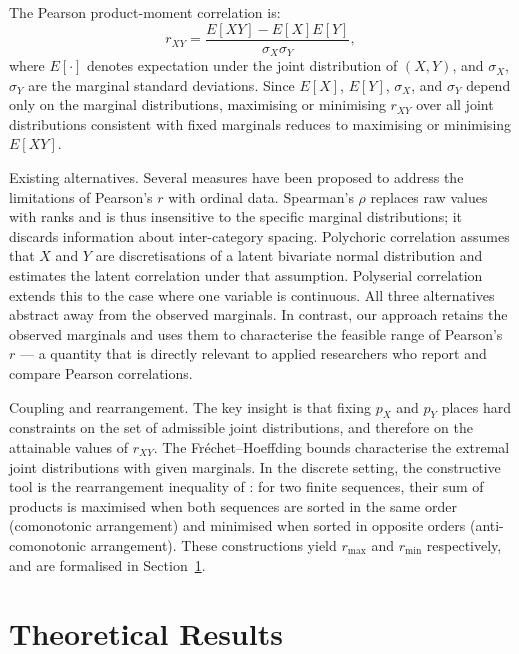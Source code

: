 \documentclass[
  12pt,
]{article}
\theoremstyle{plain}
\theoremstyle{definition}
\theoremstyle{remark}
\begin{document}
The Pearson product-moment correlation is: \[
r_{XY} = \frac{E[XY] - E[X]E[Y]}{\sigma_X \sigma_Y},
\] where \(E[\cdot]\) denotes expectation under the joint distribution
of \((X,Y)\), and \(\sigma_X\), \(\sigma_Y\) are the marginal standard
deviations. Since \(E[X]\), \(E[Y]\), \(\sigma_X\), and \(\sigma_Y\)
depend only on the marginal distributions, maximising or minimising
\(r_{XY}\) over all joint distributions consistent with fixed marginals
reduces to maximising or minimising \(E[XY]\).

Existing alternatives. Several measures have been proposed to address
the limitations of Pearson's \(r\) with ordinal data. Spearman's
\(\rho\) \autocite{spea04-proof} replaces raw values with ranks and is
thus insensitive to the specific marginal distributions; it discards
information about inter-category spacing. Polychoric correlation
\autocite{olss79-maximum} assumes that \(X\) and \(Y\) are
discretisations of a latent bivariate normal distribution and estimates
the latent correlation under that assumption. Polyserial correlation
\autocite{olss79-maximum} extends this to the case where one variable is
continuous. All three alternatives abstract away from the observed
marginals. In contrast, our approach retains the observed marginals and
uses them to characterise the feasible range of Pearson's \(r\) --- a
quantity that is directly relevant to applied researchers who report and
compare Pearson correlations.

Coupling and rearrangement. The key insight is that fixing \(p_X\) and
\(p_Y\) places hard constraints on the set of admissible joint
distributions, and therefore on the attainable values of \(r_{XY}\). The
Fréchet--Hoeffding bounds
\autocite{frec51-tableaux,hoef40-masstabinvariante} characterise the
extremal joint distributions with given marginals. In the discrete
setting, the constructive tool is the rearrangement inequality of
\textcite{hard52-inequalities}: for two finite sequences, their sum of
products is maximised when both sequences are sorted in the same order
(comonotonic arrangement) and minimised when sorted in opposite orders
(anti-comonotonic arrangement). These constructions yield \(r_{\max}\)
and \(r_{\min}\) respectively, and are formalised in
Section~\ref{sec-theory}.

\section{Theoretical Results}\label{sec-theory}
\end{document}
